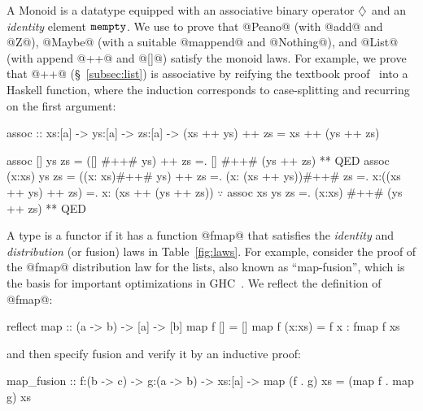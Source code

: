 
%
A Monoid is a datatype equipped with an associative
binary operator $\diamondsuit$ and an \emph{identity}
element $\texttt{mempty}$.
%
We use \toolname to prove that
%
@Peano@ (with @add@ and @Z@),
@Maybe@ (with a suitable @mappend@ and @Nothing@), and
@List@ (with append @++@ and @[]@) satisfy the monoid laws.
%
For example, we prove that @++@ (\S~\ref{subsec:list})
is associative by reifying the textbook proof~\cite{HuttonBook}
into a Haskell function, where the induction
corresponds to case-splitting and recurring
on the first argument:
%
\begin{mcode}
assoc :: xs:[a] -> ys:[a] -> zs:[a] ->
       {(xs ++ ys) ++ zs = xs ++ (ys ++ zs)}

assoc [] ys zs     = ([] #++# ys) ++ zs
                   =. [] #++# (ys ++ zs)
                   ** QED
assoc (x:xs) ys zs = ((x:  xs)#++# ys) ++ zs
                   =. (x: (xs ++ ys))#++# zs
                   =.  x:((xs ++ ys) ++ zs)
                   =.  x: (xs ++ (ys ++ zs))
                       $\because$ assoc xs ys zs
                   =. (x:xs)  #++# (ys ++ zs)
                   ** QED
\end{mcode}


%
A type is a functor if it has a function
@fmap@ that satisfies the \emph{identity}
and \emph{distribution} (or fusion) laws
in Table~\ref{fig:laws}.
%
For example, consider the proof of
the @fmap@ distribution law for the lists,
also known as ``map-fusion'', which is the
basis for important optimizations in
GHC~\cite{ghc-map-fusion}.
%
We reflect the definition of @fmap@:
%
\begin{code}
  reflect map :: (a -> b) -> [a] -> [b]
  map f []     = []
  map f (x:xs) = f x : fmap f xs
\end{code}
%
and then specify fusion and verify it by an inductive proof:
%
\begin{mcode}
  map_fusion
    :: f:(b -> c) -> g:(a -> b) -> xs:[a]
    -> {map (f . g) xs = (map f . map g) xs}
\end{mcode}

